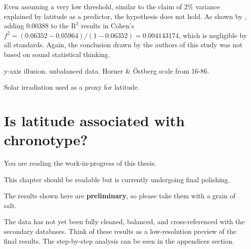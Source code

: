 \documentclass[
12pt,
openright,
oneside,
a4paper,
chapter=TITLE,
section=TITLE,
french,
spanish,
brazil,
english
]{abntex2}\usepackage{array}
\newcommand{\microskip}{\vspace{\microskipamount}}
\begin{document}
Even assuming a very low threshold, similar to the claim of 2\% variance
explained by latitude as a predictor, the hypothesis does not hold. As
shown by \textcite{leocadio-miguel2017}, adding \(0.00388\) to the
\(\text{R}^2\) results in Cohen's
\(f^2 = (0.06352 - 0.05964) / (1 - 0.06352) = 0.004143174\), which is
negligible by all standards. Again, the conclusion drawn by the authors
of this study was not based on sound statistical thinking.

y-axis illusion. unbalanced data. Horner \& Östberg scale from 16-86.

Solar irradiation used as a proxy for latitude.


\chapter{Is latitude associated with
chronotype?}\label{is-latitude-associated-with-chronotype}

\begin{tcolorbox}[enhanced jigsaw, colframe=quarto-callout-note-color-frame, rightrule=.15mm, opacitybacktitle=0.6, toprule=.15mm, opacityback=0, toptitle=1mm, bottomtitle=1mm, breakable, leftrule=.75mm, title=\textcolor{quarto-callout-note-color}{\faInfo}\hspace{0.5em}{Note}, coltitle=black, bottomrule=.15mm, arc=.35mm, titlerule=0mm, left=2mm, colback=white, colbacktitle=quarto-callout-note-color!10!white]

You are reading the work-in-progress of this thesis.

\microskip

This chapter should be readable but is currently undergoing final
polishing.

\end{tcolorbox}

\begin{tcolorbox}[enhanced jigsaw, colframe=quarto-callout-warning-color-frame, rightrule=.15mm, opacitybacktitle=0.6, toprule=.15mm, opacityback=0, toptitle=1mm, bottomtitle=1mm, breakable, leftrule=.75mm, title=\textcolor{quarto-callout-warning-color}{\faExclamationTriangle}\hspace{0.5em}{Warning}, coltitle=black, bottomrule=.15mm, arc=.35mm, titlerule=0mm, left=2mm, colback=white, colbacktitle=quarto-callout-warning-color!10!white]

The results shown here are \textbf{preliminary}, so please take them
with a grain of salt.

\microskip

The data has not yet been fully cleaned, balanced, and cross-referenced
with the secondary databases. Think of these results as a low-resolution
preview of the final results. The step-by-step analysis can be seen in
the appendices section.

\end{tcolorbox}
\end{document}
